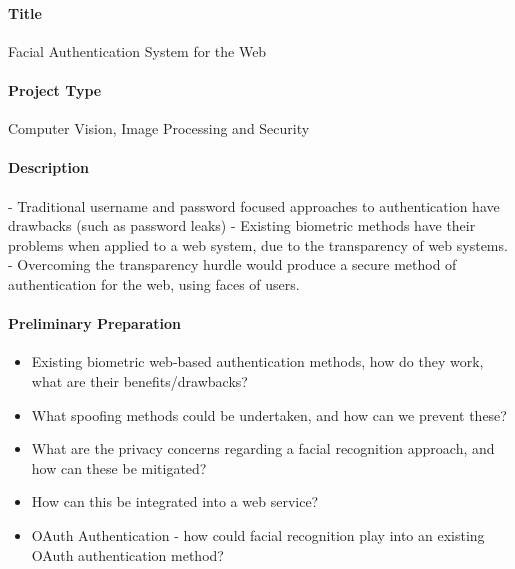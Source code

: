 \documentclass{article}
\begin{document}
    \paragraph{Title}
        Facial Authentication System for the Web
    \paragraph{Project Type}
        Computer Vision, Image Processing and Security
    \paragraph{Description}
        - Traditional username and password focused approaches to authentication have drawbacks (such as password leaks)
        - Existing biometric methods have their problems when applied to a web system, due to the transparency of web systems.
        - Overcoming the transparency hurdle would produce a secure method of authentication for the web, using faces of users.
    \paragraph{Preliminary Preparation}
        \begin{itemize}
            \item Existing biometric web-based authentication methods, how do they work, what are their benefits/drawbacks?
            \item What spoofing methods could be undertaken, and how can we prevent these?
            \item What are the privacy concerns regarding a facial recognition approach, and how can these be mitigated?
            \item How can this be integrated into a web service?
            \item OAuth Authentication - how could facial recognition play into an existing OAuth authentication method?
        \end{itemize}
\end{document}
